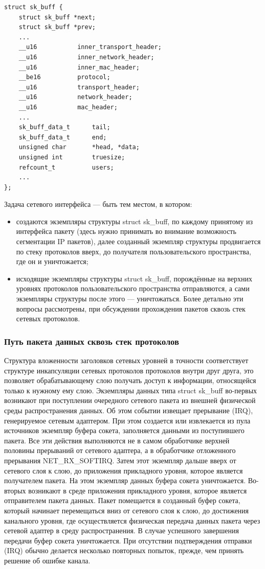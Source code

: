 \begin{lstlisting}[label=lst:sk_buff,caption=Структура данных управления передачей пакетов]
struct sk_buff {
	struct sk_buff *next;
	struct sk_buff *prev;
	...
	__u16			inner_transport_header;
	__u16			inner_network_header;
	__u16			inner_mac_header;
	__be16			protocol;
	__u16			transport_header;
	__u16			network_header;
	__u16			mac_header;
	...
	sk_buff_data_t		tail;
	sk_buff_data_t		end;
	unsigned char		*head, *data;
	unsigned int		truesize;
	refcount_t			users;
	...
};
\end{lstlisting}

Задача сетевого интерфейса — быть тем местом, в котором:
\begin{itemize}
	\item создаются экземпляры структуры struct sk\_buff, по каждому принятому из интерфейса пакету (здесь нужно принимать во внимание возможность сегментации IP пакетов), далее созданный экземпляр структуры продвигается по стеку протоколов вверх, до получателя пользовательского пространства, где он и уничтожается;
	\item исходящие экземпляры структуры struct sk\_buff, порождённые на верхних уровнях протоколов пользовательского пространства отправляются, а сами экземпляры структуры после этого --- уничтожаться.
	Более детально эти вопросы рассмотрены, при обсуждении прохождения пакетов сквозь стек
	сетевых протоколов.
\end{itemize}

\subsubsection{Путь пакета данных сквозь стек протоколов}

Структура вложенности заголовков сетевых уровней в точности соответствует структуре
инкапсуляции сетевых протоколов протоколов внутри друг друга, это позволяет обрабатывающему
слою получать доступ к информации, относящейся только к нужному ему слою.
Экземпляры данных типа struct sk\_buff во-первых возникают при поступлении очередного сетевого пакета из внешней физической среды распространения данных.
Об этом событии извещает прерывание (IRQ), генерируемое сетевым адаптером. 
При этом создается или извлекается из пула источников экземпляр буфера сокета, заполняется данными из поступившего пакета. Все эти действия выполняются не в самом обработчике верхней половины прерываний от сетевого адаптера, а в обработчике отложенного прерывания NET\_RX\_SOFTIRQ. Затем этот экземпляр дальше вверх от сетевого слоя к слою, до приложения прикладного уровня, которое является получателем пакета. 
На этом экземпляр данных буфера сокета уничтожается.
Во-вторых возникают в среде приложения прикладного уровня, которое является отправителем пакета данных. Пакет помещается в созданный буфер сокета, который начинает перемещаться вниз от сетевого слоя к слою, до достижения канального уровня, где осуществляется физическая передача данных пакета через сетевой адаптер в среду распространения. 
В случае успешного завершения передачи буфер сокета уничтожается. 
При отсутствии подтверждения отправки (IRQ) обычно делается несколько повторных попыток, прежде, чем принять решение об ошибке канала.

